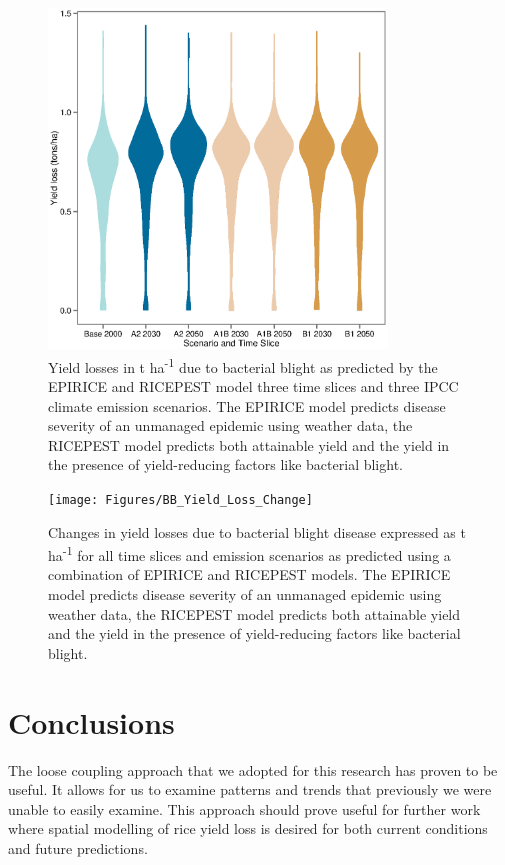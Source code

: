 \documentclass[preprint,review,12pt]{elsarticle}
\begin{document}
    \begin{figure}[H]
      \includegraphics[width = 90mm]{Figures/BB_Losses_Violin}
      \caption{Yield losses in t ha\textsuperscript{-1} due to bacterial blight as predicted by the EPIRICE and RICEPEST model three time slices and three IPCC climate emission scenarios. The EPIRICE model predicts disease severity of an unmanaged epidemic using weather data, the RICEPEST model predicts both attainable yield and the yield in the presence of yield-reducing factors like bacterial blight.}
      \label{BB_Losses_Violin}
    \end{figure}
    
    
    \begin{figure}[H]
      \texttt{[image: Figures/BB\_Yield\_Loss\_Change]}
      \caption{Changes in yield losses due to bacterial blight disease expressed as t ha\textsuperscript{-1} for all time slices and emission scenarios as predicted using a combination of EPIRICE and RICEPEST models. The EPIRICE model predicts disease severity of an unmanaged epidemic using weather data, the RICEPEST model predicts both attainable yield and the yield in the presence of yield-reducing factors like bacterial blight.}
      \label{BB_Change_Map}
    \end{figure}
    
    \section{Conclusions}
    The loose coupling approach that we adopted for this research has proven to be useful. It allows for us to examine patterns and trends that previously we were unable to easily examine. This approach should prove useful for further work where spatial modelling of rice yield loss is desired for both current conditions and future predictions.
    
\end{document}
